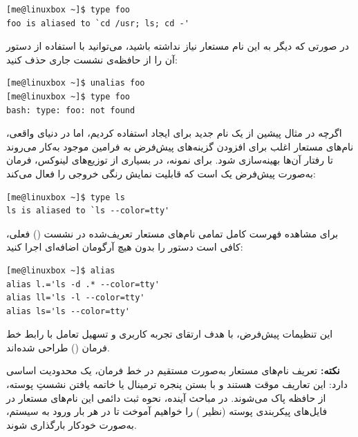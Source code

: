 \begin{latin}
\begin{lstlisting}
[me@linuxbox ~]$ type foo
foo is aliased to `cd /usr; ls; cd -'
\end{lstlisting}
\end{latin}

در صورتی که دیگر به این نام مستعار نیاز نداشته باشید، می‌توانید با استفاده از دستور  آن را از حافظه‌ی نشست جاری حذف کنید:

\begin{latin}
\begin{lstlisting}
[me@linuxbox ~]$ unalias foo
[me@linuxbox ~]$ type foo
bash: type: foo: not found
\end{lstlisting}
\end{latin}

اگرچه در مثال پیشین از یک نام جدید برای ایجاد  استفاده کردیم، اما در دنیای واقعی، نام‌های مستعار اغلب برای افزودن گزینه‌های پیش‌فرض به فرامین موجود به‌کار می‌روند تا رفتار آن‌ها بهینه‌سازی شود. برای نمونه، در بسیاری از توزیع‌های لینوکس، فرمان  به‌صورت پیش‌فرض یک  است که قابلیت نمایش رنگی خروجی را فعال می‌کند:

\begin{latin}
\begin{lstlisting}
[me@linuxbox ~]$ type ls
ls is aliased to `ls --color=tty'
\end{lstlisting}
\end{latin}

برای مشاهده فهرست کامل تمامی نام‌های مستعار تعریف‌شده در نشست () فعلی، کافی است دستور  را بدون هیچ آرگومان اضافه‌ای اجرا کنید:

\begin{latin}
\begin{lstlisting}
[me@linuxbox ~]$ alias
alias l.='ls -d .* --color=tty'
alias ll='ls -l --color=tty'
alias ls='ls --color=tty'
\end{lstlisting}
\end{latin}

این تنظیمات پیش‌فرض، با هدف ارتقای تجربه کاربری و تسهیل تعامل با رابط خط فرمان () طراحی شده‌اند.

\begin{note}
\textbf{نکته:} تعریف نام‌های مستعار به‌صورت مستقیم در خط فرمان، یک محدودیت اساسی دارد: این تعاریف موقت هستند و با بستن پنجره ترمینال یا خاتمه یافتن نشستِ پوسته، از حافظه پاک می‌شوند. در مباحث آینده، نحوه ثبت دائمی این نام‌های مستعار در فایل‌های پیکربندی پوسته (نظیر ) را خواهیم آموخت تا در هر بار ورود به سیستم، به‌صورت خودکار بارگذاری شوند.
\end{note}

